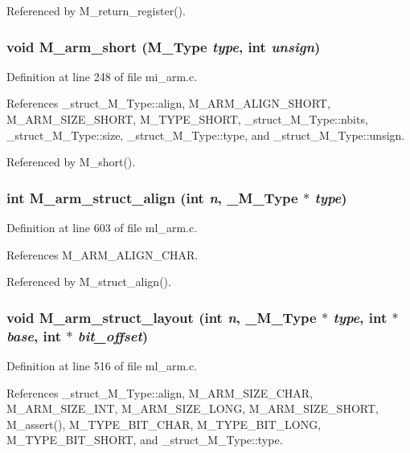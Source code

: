 Referenced by M\_\-return\_\-register().
\subsubsection{\setlength{\rightskip}{0pt plus 5cm}void M\_\-arm\_\-short (\bf{M\_\-Type} {\em type}, int {\em unsign})}\label{m__arm_8h_e6108d2e40eb42b66173929a0e0c6b13}




Definition at line 248 of file mi\_\-arm.c.

References \_\-struct\_\-M\_\-Type::align, M\_\-ARM\_\-ALIGN\_\-SHORT, M\_\-ARM\_\-SIZE\_\-SHORT, M\_\-TYPE\_\-SHORT, \_\-struct\_\-M\_\-Type::nbits, \_\-struct\_\-M\_\-Type::size, \_\-struct\_\-M\_\-Type::type, and \_\-struct\_\-M\_\-Type::unsign.

Referenced by M\_\-short().
\subsubsection{\setlength{\rightskip}{0pt plus 5cm}int M\_\-arm\_\-struct\_\-align (int {\em n}, \bf{\_\-M\_\-Type} $\ast$ {\em type})}\label{m__arm_8h_d23e2433a208747d34bed1c2f7f72520}




Definition at line 603 of file ml\_\-arm.c.

References M\_\-ARM\_\-ALIGN\_\-CHAR.

Referenced by M\_\-struct\_\-align().
\subsubsection{\setlength{\rightskip}{0pt plus 5cm}void M\_\-arm\_\-struct\_\-layout (int {\em n}, \bf{\_\-M\_\-Type} $\ast$ {\em type}, int $\ast$ {\em base}, int $\ast$ {\em bit\_\-offset})}\label{m__arm_8h_6f9b01f2d38f36a80bae22807f26911c}




Definition at line 516 of file ml\_\-arm.c.

References \_\-struct\_\-M\_\-Type::align, M\_\-ARM\_\-SIZE\_\-CHAR, M\_\-ARM\_\-SIZE\_\-INT, M\_\-ARM\_\-SIZE\_\-LONG, M\_\-ARM\_\-SIZE\_\-SHORT, M\_\-assert(), M\_\-TYPE\_\-BIT\_\-CHAR, M\_\-TYPE\_\-BIT\_\-LONG, M\_\-TYPE\_\-BIT\_\-SHORT, and \_\-struct\_\-M\_\-Type::type.


